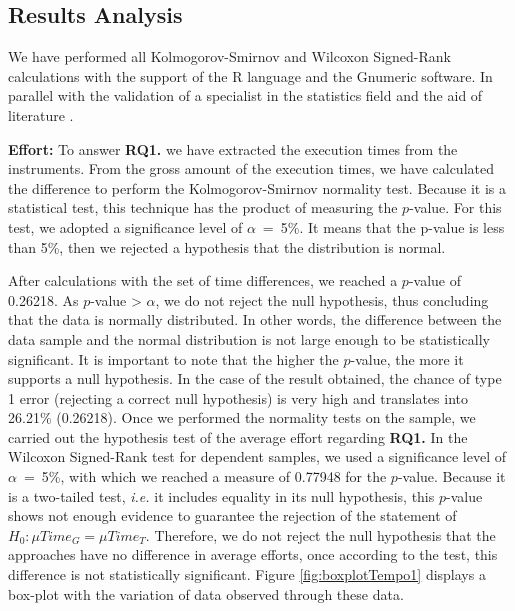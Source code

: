 \subsection{Results Analysis}
\label{ssec_experiments:preliminary_resultAnalysis}

We have performed all Kolmogorov-Smirnov and Wilcoxon Signed-Rank calculations with the support of the R language and the Gnumeric software. In parallel with the validation of a specialist in the statistics field and the aid of literature \cite{Triola:2018}.

\textbf{Effort:} 
To answer \textbf{RQ1.} 
we have extracted the execution times from the instruments.
From the gross amount of the execution times, we have calculated the difference to perform the Kolmogorov-Smirnov normality test.
Because it is a statistical test, this technique has the product of measuring the $p$-value.
For this test, we adopted a significance level of $\alpha$~=~5\%.
It means that the p-value is less than 5\%, then we rejected a hypothesis that the distribution is normal.

After calculations with the set of time differences, we reached a $p$-value of 0.26218.
As $p$-value > $\alpha$, we do not reject the null hypothesis, thus concluding that the data is normally distributed.
In other words, the difference between the data sample and the normal distribution is not large enough to be statistically significant.
It is important to note that the higher the $p$-value, the more it supports a null hypothesis.
In the case of the result obtained, the chance of type 1 error (rejecting a correct null hypothesis) is very high and translates into 26.21\% (0.26218).
Once we performed the normality tests on the sample, we carried out the hypothesis test of the average effort regarding \textbf{RQ1.}
In the Wilcoxon Signed-Rank test for dependent samples, we used a significance level of $\alpha$~=~5\%, with which we reached a measure of 0.77948 for the $p$-value.
Because it is a two-tailed test, \textit{i.e.} it includes equality in its null hypothesis, this $p$-value shows not enough evidence to guarantee the rejection of the statement of $H_0: \mu Time_G = \mu Time_T$.
Therefore, we do not reject the null hypothesis that the approaches have no difference in average efforts, once according to the test, this difference is not statistically significant. 
Figure \ref{fig:boxplotTempo1} displays a box-plot with the variation of data observed through these data.

